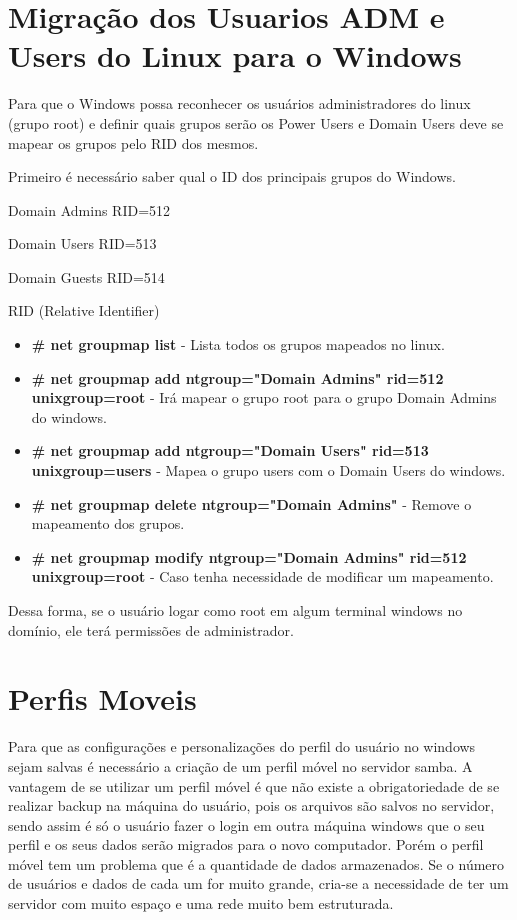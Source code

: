 \section{Migração dos Usuarios ADM e Users do Linux para o Windows}

Para que o Windows possa reconhecer os usuários administradores do linux (grupo root) e definir quais grupos serão os Power Users e Domain Users deve se mapear os grupos pelo RID dos mesmos.

Primeiro é necessário saber qual o ID dos principais grupos do Windows.

Domain Admins RID=512 

Domain Users RID=513 

Domain Guests RID=514

RID (Relative Identifier) 

\begin{itemize}
	\item \textbf{\# net groupmap list} - Lista todos os grupos mapeados no linux.
	\item \textbf{\# net groupmap add ntgroup="Domain Admins" rid=512 unixgroup=root} - Irá mapear o grupo root para o grupo Domain Admins do windows.
	\item \textbf{\# net groupmap add ntgroup="Domain Users" rid=513 unixgroup=users} - Mapea o grupo users com o Domain Users do windows.
	\item \textbf{\# net groupmap delete ntgroup="Domain Admins"} - Remove o mapeamento dos grupos.
	\item \textbf{\# net groupmap modify ntgroup="Domain Admins" rid=512 unixgroup=root} - Caso tenha necessidade de modificar um mapeamento.
\end{itemize}

Dessa forma, se o usuário logar como root em algum terminal windows no domínio, ele terá permissões de administrador.

\section{Perfis Moveis}

Para que as configurações e personalizações do perfil do usuário no windows sejam salvas é necessário a criação de um perfil móvel no servidor samba. 
A vantagem de se utilizar um perfil móvel é que não existe a obrigatoriedade de se realizar backup na máquina do usuário, pois os arquivos são salvos no servidor, sendo assim é só o usuário fazer o login em outra máquina windows que o seu perfil e os seus dados serão migrados para o novo computador. Porém o perfil móvel tem um problema que é a quantidade de dados armazenados. Se o número de usuários e dados de cada um for muito grande, cria-se a necessidade de ter um servidor com muito espaço e uma rede muito bem estruturada. 

